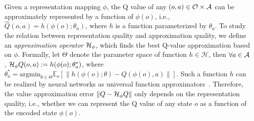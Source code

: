 Given a representation mapping $\phi$, the Q value of any $(o,a)\in\mathcal{O}\times\mathcal{A}$ can be approximately represented by a function of $\phi(o)$, i.e., $\hat{Q}(o, a) = h(\phi(o); \theta_a)$, where $h$ is a function parameterized by $\theta_a$.
To study the relation between representation quality and approximation quality,
we define an \textit{approximation operator} $\mathcal{H}_{\phi}$, which finds the best Q-value approximation based on $\phi$. Formally, let $\Theta$ denote the parameter space of function $h\in\mathcal{H}$, then $\forall a\in\mathcal{A}$, $\mathcal{H}_{\phi} Q(o,a) := h(\phi(o);\theta^*_a)$, where $\theta^*_a=\mathrm{argmin}_{\theta\in\Theta} \mathbb{E}_o [\| h(\phi(o);\theta) - Q(\phi(o),a) \| ]$. Such a function $h$ can be realized by neural networks as universal function approximators~\citep{hornik1989multilayer}.
Therefore, the value approximation error $\|Q-\mathcal{H}_{\phi} Q\|$ only depends on the representation quality, i.e., whether we can represent the Q value of any state $o$ as a function of the encoded state $\phi(o)$.

